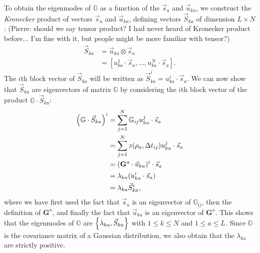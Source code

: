 \documentclass[preprint,amsmath,amssymb,superscriptaddress,showpacs,pre]{revtex4-1}
\let\originalleft\left
\let\originalright\right
\renewcommand{\left}{\mathopen{}\mathclose\bgroup\originalleft}
\renewcommand{\right}{\aftergroup\egroup\originalright}
\newcommand{\pierre}[1]{{\color{red}Pierre: #1}}
\newcommand{\vsa}{\vec{s}_a}
\newcommand{\vuka}{\vec{u}_{ka}}
\begin{document}
To obtain the eigenmodes of $\mathbb{G}$ as a function of the $\vsa$ and $\vuka$, we construct the \emph{Kronecker} product of vectors $\vsa$ and $\vuka$, defining vectors $\vec{S}_{ka}$ of dimension $L\times N$: (\pierre{should we say tensor product? I had never heard of Kronecker product before... I'm fine with it, but people might be more familiar with tensor?})
\begin{equation}
	\begin{split}
		\vec{S}_{ka} &= \vuka \otimes \vsa \\
		&= [u_{ka}^1\cdot\vsa, \ldots, u_{ka}^N\cdot\vsa].
	\end{split}
	\label{eq:Sdef}
\end{equation}
The $i$th block vector of $\vec{S}_{ka}$ will be written as $\vec{S}_{ka}^i = u_{ka}^i\cdot\vsa$. 
We can now show that $\vec{S}_{ka}$ are eigenvectors of matrix $\mathbb{G}$ by considering the $i$th block vector of the product $\mathbb{G}\cdot\vec{S}_{ka}$:
\begin{equation}
	\begin{split}
		\left(\mathbb{G}\cdot\vec{S}_{ka}\right)^i &= \sum_{j=1}^N \mathbb{G}_{ij} u_{ka}^j\cdot\vsa \\
		&= \sum_{j=1}^N z(\rho_a, \Delta t_{ij}) u_{ka}^j\cdot \vsa \\
		&= (\mathbf{G}^a\cdot\vuka)^i \cdot \vsa\\
		&= \lambda_{ka}(u_{ka}^i\cdot\vsa) \\
		&= \lambda_{ka}\vec{S}_{ka}^i,
	\end{split}
\end{equation}
where we have first used the fact that $\vsa$ is an eigenvector of $\mathbb{G}_{ij}$, then the definition of $\mathbf{G}^a$, and finally the fact that $\vuka$ is an eigenvector of $\mathbf{G}^a$.
This shows that the eigenmodes of $\mathbb{G}$ are $\left\{ \lambda_{ka}, \vec{S}_{ka} \right\}$ with $1\leq k\leq N$ and $1\leq a \leq L$. 
Since $\mathbb{G}$ is the covariance matrix of a Gaussian distribution, we also obtain that the $\lambda_{ka}$ are strictly positive.
\end{document}
